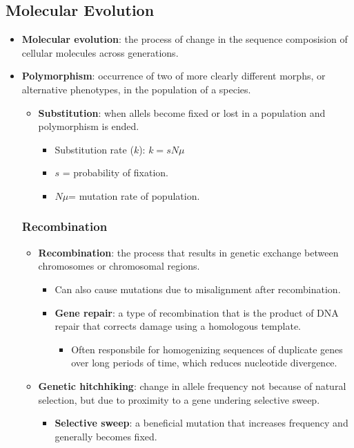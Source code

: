 \documentclass[12pt,a4paper]{article}
\begin{document}
\subsection{Molecular Evolution}
\begin{itemize}
    \item \textbf{Molecular evolution}: the process of change in the sequence composision of cellular molecules across generations.
    \item \textbf{Polymorphism}: occurrence of two of more clearly different morphs, or alternative phenotypes, in the population of a species.
    \begin{itemize}
        \item \textbf{Substitution}: when allels become fixed or lost in a population and polymorphism is ended.
            \begin{itemize}
                \item Substitution rate (\(k\)): \(k = sN\mu\)
                \item \(s\) = probability of fixation.
                \item \(N\mu\)= mutation rate of population.
            \end{itemize}
    \end{itemize}
    \subsubsection{Recombination}
    \begin{itemize}
    \item \textbf{Recombination}: the process that results in genetic exchange between chromosomes or chromosomal regions.
        \begin{itemize}
            \item Can also cause mutations due to misalignment after recombination.
            \item \textbf{Gene repair}: a type of recombination that is the product of DNA repair that corrects damage using a homologous template. 
                \begin{itemize}
                    \item Often responsbile for homogenizing sequences of duplicate genes over long periods of time, which reduces nucleotide divergence.
                \end{itemize}
        \end{itemize}
    \item \textbf{Genetic hitchhiking}: change in allele frequency not because of natural selection, but due to proximity to a gene undering selective sweep.
        \begin{itemize}
            \item \textbf{Selective sweep}: a beneficial mutation that increases frequency and generally becomes fixed. 
        \end{itemize}
    \end{itemize}

\end{itemize}
\end{document}
